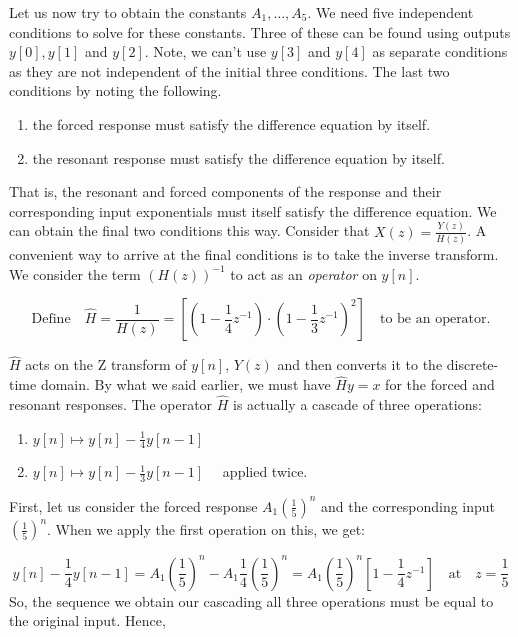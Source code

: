\documentclass{article}
\theoremstyle{definition}
\begin{document}
Let us now try to obtain the constants $A_1, \ldots ,A_5$. We need five independent conditions to solve for these constants. Three of these can be found using outputs $y[0], y[1]$ and $y[2]$. Note, we can't use $y[3]$ and $y[4]$ as separate conditions as they are not independent of the initial three conditions. The last two conditions by noting the following. 

\begin{enumerate}
    \item the forced response must satisfy the difference equation by itself.
    \item the resonant response must satisfy the difference equation by itself.
\end{enumerate}

That is, the resonant and forced components of the response and their corresponding input exponentials must itself satisfy the difference equation. We can obtain the final two conditions this way. Consider that $X(z) = \frac{Y(z)}{H(z)}$. A convenient way to arrive at the final conditions is to take the inverse transform. We consider the term $(H(z))^{-1}$ to act as an \textit{operator} on $y[n]$. 

\[
    \text{Define} \quad \hat{H} = \frac{1}{H(z)} = \left[ \left( 1 - \frac{1}{4}z^{-1}  \right) \cdot \left( 1 - \frac{1}{3}z^{-1} \right)^2 \right] \quad \text{to be an operator}.
\]

$\hat{H}$ acts on the Z transform of $y[n]$, $Y(z)$ and then converts it to the discrete-time domain. By what we said earlier, we must have $\hat{H} y = x$ for the forced and resonant responses. The operator $\hat{H}$ is actually a cascade of three operations:

\begin{enumerate}
    \item $y[n] \mapsto y[n] - \frac{1}{4} y[n-1]$
    \item $y[n] \mapsto y[n] - \frac{1}{3}y[n-1] \quad$ applied twice.
\end{enumerate}

First, let us consider the forced response $A_1 (\frac{1}{5})^n$ and the corresponding input $(\frac{1}{5})^n$. When we apply the first operation on this, we get:

\[
    y[n] - \frac{1}{4}y[n-1] = A_1 \left( \frac{1}{5}\right)^n - A_1 \frac{1}{4} \left( \frac{1}{5}\right)^n = A_1 \left( \frac{1}{5}\right)^n \left[ 1 - \frac{1}{4}z^{-1} \right] \quad \text{at} \quad z = \frac{1}{5}
\]
So, the sequence we obtain our cascading all three operations must be equal to the original input. Hence, 
\end{document}
